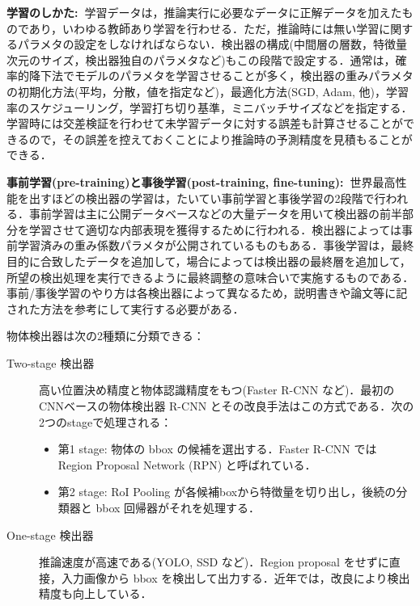 \documentclass[originalpaper]{jsaiart}     %
\begin{document}
{\bf 学習のしかた:\ }学習データは，推論実行に必要なデータに正解データを加えたものであり，いわゆる教師あり学習を行わせる．ただ，推論時には無い学習に関するパラメタの設定をしなければならない．検出器の構成(中間層の層数，特徴量次元のサイズ，検出器独自のパラメタなど)もこの段階で設定する．通常は，確率的降下法でモデルのパラメタを学習させることが多く，検出器の重みパラメタの初期化方法(平均，分散，値を指定など)，最適化方法(SGD, Adam, 他)，学習率のスケジューリング，学習打ち切り基準，ミニバッチサイズなどを指定する．学習時には交差検証を行わせて未学習データに対する誤差も計算させることができるので，その誤差を控えておくことにより推論時の予測精度を見積もることができる．

{\bf 事前学習(pre-training)と事後学習(post-training, fine-tuning):\ }世界最高性能を出すほどの検出器の学習は，たいてい事前学習と事後学習の2段階で行われる．事前学習は主に公開データベースなどの大量データを用いて検出器の前半部分を学習させて適切な内部表現を獲得するために行われる．検出器によっては事前学習済みの重み係数パラメタが公開されているものもある．事後学習は，最終目的に合致したデータを追加して，場合によっては検出器の最終層を追加して，所望の検出処理を実行できるように最終調整の意味合いで実施するものである．事前/事後学習のやり方は各検出器によって異なるため，説明書きや論文等に記された方法を参考にして実行する必要がある．

物体検出器は次の2種類に分類できる\cite{JZLYLFQ19}：
\begin{description}
    \item[Two-stage 検出器] 高い位置決め精度と物体認識精度をもつ(Faster R-CNN など)．最初のCNNベースの物体検出器 R-CNN とその改良手法はこの方式である．次の2つのstageで処理される：
    \begin{itemize}
        \item 第1 stage: 物体の bbox の候補を選出する．Faster R-CNN では Region Proposal Network (RPN) と呼ばれている．
        \item 第2 stage: RoI Pooling が各候補boxから特徴量を切り出し，後続の分類器と bbox 回帰器がそれを処理する．
    \end{itemize}
    \item[One-stage 検出器] 推論速度が高速である(YOLO, SSD など)．Region proposal をせずに直接，入力画像から bbox を検出して出力する．近年では，改良により検出精度も向上している．
\end{description}
\end{document}
